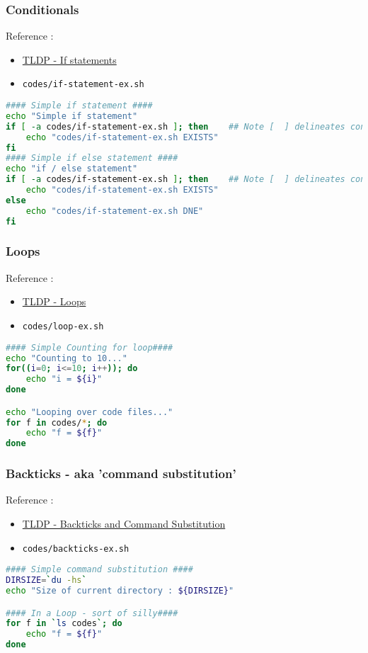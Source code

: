 \documentclass{beamer}
\newcommand{\code}[1]{\colorbox{codegray}{\texttt{#1}}}
\begin{document}
\begin{frame}[fragile]
\frametitle{Conditionals}
Reference :
\begin{itemize}
    \item \href{https://tldp.org/LDP/Bash-Beginners-Guide/html/sect_07_01.html}{TLDP - If statements}
    \pause
    \item \code{codes/if-statement-ex.sh}
\end{itemize}
\begingroup
\scriptsize
\begin{lstlisting}[backgroundcolor = \color{codegray}, language = Bash, showstringspaces=false]
#### Simple if statement ####
echo "Simple if statement"
if [ -a codes/if-statement-ex.sh ]; then    ## Note [  ] delineates conditional
    echo "codes/if-statement-ex.sh EXISTS"
fi
#### Simple if else statement ####
echo "if / else statement"
if [ -a codes/if-statement-ex.sh ]; then    ## Note [  ] delineates conditional
    echo "codes/if-statement-ex.sh EXISTS"
else
    echo "codes/if-statement-ex.sh DNE"
fi
\end{lstlisting}
\endgroup
\end{frame}



\begin{frame}[fragile]
\frametitle{Loops}
Reference :
\begin{itemize}
    \item \href{https://tldp.org/LDP/abs/html/loops1.html}{TLDP - Loops }
    \pause
    \item \code{codes/loop-ex.sh}
\end{itemize}
\begingroup
\scriptsize
\begin{lstlisting}[backgroundcolor = \color{codegray}, language = Bash, showstringspaces=false]
#### Simple Counting for loop####
echo "Counting to 10..."
for((i=0; i<=10; i++)); do
    echo "i = ${i}"
done

echo "Looping over code files..."
for f in codes/*; do
    echo "f = ${f}"
done
\end{lstlisting}
\endgroup
\end{frame}


\begin{frame}[fragile]
\frametitle{Backticks - aka 'command substitution'}
Reference :
\begin{itemize}
    \item \href{https://tldp.org/LDP/abs/html/commandsub.html}{TLDP - Backticks and Command Substitution}
    \pause
    \item \code{codes/backticks-ex.sh}
\end{itemize}
\begingroup
\scriptsize
\begin{lstlisting}[backgroundcolor = \color{codegray}, language = Bash, showstringspaces=false]
#### Simple command substitution ####
DIRSIZE=`du -hs`
echo "Size of current directory : ${DIRSIZE}"

#### In a Loop - sort of silly####
for f in `ls codes`; do
    echo "f = ${f}"
done
\end{lstlisting}
\endgroup
\end{frame}
\end{document}
